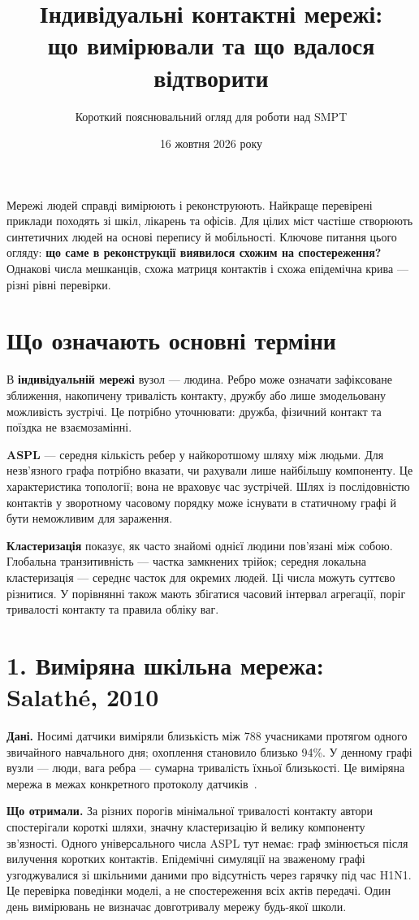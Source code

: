 \documentclass[11pt,a4paper]{article}
\title{Індивідуальні контактні мережі:\\що вимірювали та що вдалося відтворити}
\author{Короткий пояснювальний огляд для роботи над SMPT}
\date{16 жовтня 2026 року}
\begin{document}
\maketitle
\noindent Мережі людей справді вимірюють і реконструюють. Найкраще перевірені приклади походять зі шкіл, лікарень та офісів. Для цілих міст частіше створюють синтетичних людей на основі перепису й мобільності. Ключове питання цього огляду: \textbf{що саме в реконструкції виявилося схожим на спостереження?} Однакові числа мешканців, схожа матриця контактів і схожа епідемічна крива --- різні рівні перевірки.

\section*{Що означають основні терміни}
В \textbf{індивідуальній мережі} вузол --- людина. Ребро може означати зафіксоване зближення, накопичену тривалість контакту, дружбу або лише змодельовану можливість зустрічі. Це потрібно уточнювати: дружба, фізичний контакт та поїздка не взаємозамінні.

\textbf{ASPL} --- середня кількість ребер у найкоротшому шляху між людьми. Для незв'язного графа потрібно вказати, чи рахували лише найбільшу компоненту. Це характеристика топології; вона не враховує час зустрічей. Шлях із послідовністю контактів у зворотному часовому порядку може існувати в статичному графі й бути неможливим для зараження.

\textbf{Кластеризація} показує, як часто знайомі однієї людини пов'язані між собою. Глобальна транзитивність --- частка замкнених трійок; середня локальна кластеризація --- середнє часток для окремих людей. Ці числа можуть суттєво різнитися. У порівнянні також мають збігатися часовий інтервал агрегації, поріг тривалості контакту та правила обліку ваг.

\section*{1. Виміряна шкільна мережа: Salathé, 2010}
\textbf{Дані.} Носимі датчики виміряли близькість між 788 учасниками протягом одного звичайного навчального дня; охоплення становило близько 94\%. У денному графі вузли --- люди, вага ребра --- сумарна тривалість їхньої близькості. Це виміряна мережа в межах конкретного протоколу датчиків~\cite{salathe}.

\textbf{Що отримали.} За різних порогів мінімальної тривалості контакту автори спостерігали короткі шляхи, значну кластеризацію й велику компоненту зв'язності. Одного універсального числа ASPL тут немає: граф змінюється після вилучення коротких контактів. Епідемічні симуляції на зваженому графі узгоджувалися зі шкільними даними про відсутність через гарячку під час H1N1. Це перевірка поведінки моделі, а не спостереження всіх актів передачі. Один день вимірювань не визначає довготривалу мережу будь-якої школи.
\end{document}
